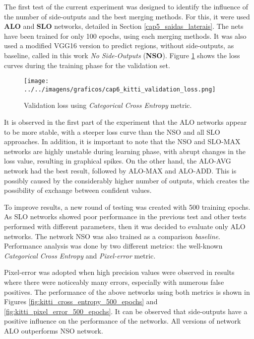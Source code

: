 The first test of the current experiment was designed to identify the influence of the number of side-outputs and the best merging methods.
For this, it were used \textbf{ALO} and \textbf{SLO} networks, detailed in Section \ref{cap5_saidas_laterais}.
The nets have been trained for only 100 epochs, using each merging methods.
It was also used a modified VGG16 version to predict regions, without side-outputs, as baseline, called in this work \textit{No Side-Outputs} (\textbf{NSO}).
Figure \ref{fig:kitti_validation_loss_100epochs} shows the loss curves during the training phase for the validation set.

\begin{figure}
  \centering
  \caption{Validation loss using \textit{Categorical Cross Entropy} metric.}
  \texttt{[image: ../../imagens/graficos/cap6\_kitti\_validation\_loss.png]}
  \sourceOwn
  \label{fig:kitti_validation_loss_100epochs}
\end{figure}

It is observed in the first part of the experiment that the ALO networks appear to be more stable, with a steeper loss curve than the NSO and all SLO approaches.
In addition, it is important to note that the NSO and SLO-MAX networks are highly unstable during learning phase, with abrupt changes in the loss value, resulting in graphical spikes.
On the other hand, the ALO-AVG network had the best result, followed by ALO-MAX and ALO-ADD.
This is possibly caused by the considerably higher number of outputs, which creates the possibility of exchange between confident values.

To improve results, a new round of testing was created with 500 training epochs.
As SLO networks showed poor performance in the previous test and other tests performed with different parameters, then it was decided to evaluate only ALO networks.
The network NSO was also trained as a comparison \textit{baseline}.
Performance analysis was done by two different metrics: the well-known \textit{Categorical Cross Entropy} and \textit{Pixel-error} metric.

Pixel-error was adopted when high precision values were observed in results where there were noticeably many errors, especially with numerous false positives.
The performance of the above networks using both metrics is shown in Figures \ref{fig:kitti_cross_entropy_500_epochs} and \ref{fig:kitti_pixel_error_500_epochs}. 
It can be observed that side-outputs have a positive influence on the performance of the networks.
All versions of network ALO outperforms NSO network.

